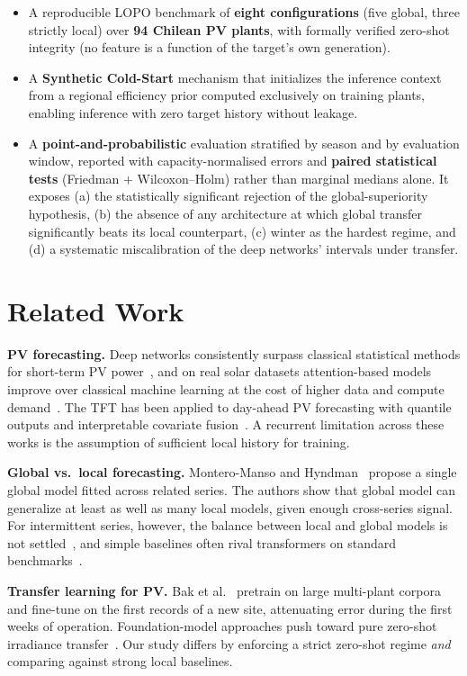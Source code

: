 \documentclass[conference]{IEEEtran}
\begin{document}
\begin{itemize}
\item A reproducible LOPO benchmark of \textbf{eight configurations} (five global, three
strictly local) over \textbf{94 Chilean PV plants}, with formally verified zero-shot
integrity (no feature is a function of the target's own generation).
\item A \textbf{Synthetic Cold-Start} mechanism that initializes the inference
context from a regional efficiency prior computed exclusively on training plants, enabling
inference with zero target history without leakage.
\item A \textbf{point-and-probabilistic} evaluation stratified by season and by evaluation
window, reported with capacity-normalised errors and \textbf{paired statistical tests}
(Friedman + Wilcoxon--Holm) rather than marginal medians alone. It exposes (a) the
statistically significant rejection of the global-superiority hypothesis, (b) the absence of
any architecture at which global transfer significantly beats its local counterpart,
(c) winter as the hardest regime, and (d) a systematic miscalibration of the deep networks'
intervals under transfer.
\end{itemize}

\section{Related Work}
\textbf{PV forecasting.} Deep networks consistently surpass classical statistical methods
for short-term PV power~\cite{Mellit2021,Kumari2021}, and on real solar datasets
attention-based models improve over classical machine learning at the cost of higher data
and compute demand~\cite{Arslan2025}. The TFT has been applied to day-ahead PV forecasting
with quantile outputs and interpretable covariate fusion~\cite{LopezSantos2022}. A recurrent
limitation across these works is the assumption of sufficient local history for training.

\textbf{Global vs.\ local forecasting.} Montero-Manso and Hyndman~\cite{MonteroManso2021}
propose a single global model fitted across related series. The authors show that global model can  generalize at least as
well as many local models, given enough cross-series signal. For intermittent series,
however, the balance between local and global models is not settled~\cite{Damato2026}, and
simple baselines often rival transformers on standard benchmarks~\cite{Zeng2023}.

\textbf{Transfer learning for PV.} Bak et al.~\cite{Bak2025} pretrain on large multi-plant
corpora and fine-tune on the first records of a new site, attenuating error during the first
weeks of operation. Foundation-model approaches push toward pure zero-shot irradiance transfer~\cite{Mishra2025}. Our study
differs by enforcing a strict zero-shot regime \emph{and} comparing against strong local baselines.
\end{document}
